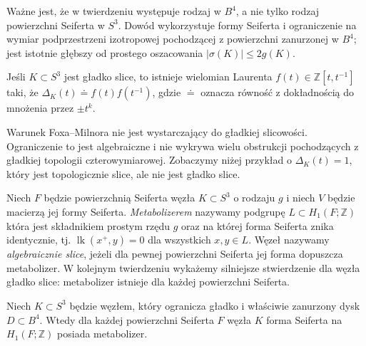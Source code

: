 \begin{uwaga}
Ważne jest, że w twierdzeniu występuje rodzaj w $B^4$,
a nie tylko rodzaj powierzchni Seiferta w $S^3$.
Dowód wykorzystuje formy Seiferta i ograniczenie
na wymiar podprzestrzeni izotropowej pochodzącej
z powierzchni zanurzonej w $B^4$; jest istotnie głębszy
od prostego oszacowania $|\sigma(K)|\leq2g(K)$.
\end{uwaga}

\begin{twierdzenie}
\label{thm:kt-fox-milnor}
Jeśli $K\subset S^3$ jest gładko slice, to istnieje
wielomian Laurenta $f(t)\in\mathbb Z[t,t^{-1}]$ taki, że
$\Delta_K(t)\doteq f(t)f(t^{-1})$,
gdzie $\doteq$ oznacza równość z dokładnością do
mnożenia przez $\pm t^k$.
\end{twierdzenie}

\begin{uwaga}
Warunek Foxa--Milnora nie jest wystarczający do gładkiej
slicowości. Ograniczenie to jest algebraiczne i nie wykrywa
wielu obstrukcji pochodzących z gładkiej topologii
czterowymiarowej. Zobaczymy niżej przykład o
$\Delta_K(t)=1$, który jest topologicznie slice,
ale nie jest gładko slice.
\end{uwaga}

\begin{definicja}
Niech $F$ będzie powierzchnią Seiferta węzła $K\subset S^3$
o rodzaju $g$ i niech $V$ będzie macierzą jej formy Seiferta.
\emph{Metabolizerem} nazywamy podgrupę $L\subset H_1(F;\mathbb Z)$
która jest składnikiem prostym rzędu $g$ oraz na której
forma Seiferta znika identycznie, tj.
$\operatorname{lk}(x^+,y)=0$ dla wszystkich $x,y\in L$.
Węzeł nazywamy \emph{algebraicznie slice}, jeżeli
dla pewnej powierzchni Seiferta jej forma
dopuszcza metabolizer. W kolejnym twierdzeniu
wykażemy silniejsze stwierdzenie dla węzła
gładko slice: metabolizer istnieje dla każdej
powierzchni Seiferta.
\end{definicja}

\begin{twierdzenie}
\label{thm:kt-slice-metabolic}
Niech $K\subset S^3$ będzie węzłem, który ogranicza gładko
i właściwie zanurzony dysk $D\subset B^4$.
Wtedy dla każdej powierzchni
Seiferta $F$ węzła $K$ forma Seiferta na $H_1(F;\mathbb Z)$
posiada metabolizer.
\end{twierdzenie}


